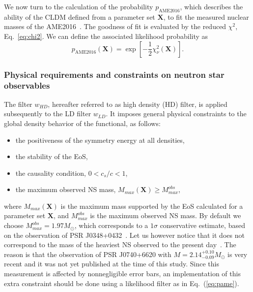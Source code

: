 We now turn to the calculation of the probability $p_{\text{AME2016}}$, which 
describes the ability of the CLDM defined from a parameter set $\bm{X}$, to fit 
the measured nuclear masses of the AME2016~\cite{Huang2017}. The goodness of 
fit is evaluated by the reduced $\chi^2$, Eq.~\ref{eq:chi2}. We can define the 
associated likelihood probability as
%
\begin{equation}
  p_{\text{AME2016}}(\bm{X}) =
  \exp\left[-\frac{1}{2}\chi_\nu^2(\bm{X})\right].\label{eq:pame}
\end{equation}
%
 
\subsubsection{Physical requirements and constraints on neutron star 
observables}\label{subsubsec:hdconst}

The filter $w_{HD}$, hereafter referred to as high density (HD) filter, is
applied subsequently to the LD filter $w_{LD}$. It imposes general physical 
constraints to the global density behavior of the functional, as follows:
%
\begin{itemize}
  \item the positiveness of the symmetry energy at all densities,
  \item the stability of the EoS,
  \item the causality condition, $0 < c_s/c < 1$,
  \item the maximum observed NS mass, $M_{max}(\bm{X}) \geq M_{max}^{obs}$,
\end{itemize}
%
where $M_{max}(\bm{X})$ is the maximum mass supported by the EoS calculated for 
a parameter set $\bm{X}$, and $M_{max}^{obs}$ is the maximum observed NS mass. 
By default we choose $M_{max}^{obs} = 1.97M_\odot$, which corresponds to 
a $1\sigma$ conservative estimate, based on the observation of PSR 
J0348+0432~\cite{Antoniadis2013}. 
Let us however notice that it does not correspond to the mass of the heaviest 
NS observed to the present day~\cite{Cromartie2020}. The reason is that the
observation of PSR J0740+6620 with $M = 2.14_{-0.09}^{+0.10}M_\odot$ is very 
recent and it was not yet published at the time of this study. 
Since this measurement is affected by nonnegligible error bars, an
implementation of this extra constraint should be done using a likelihood
filter as in Eq.~(\ref{eq:pame}).

